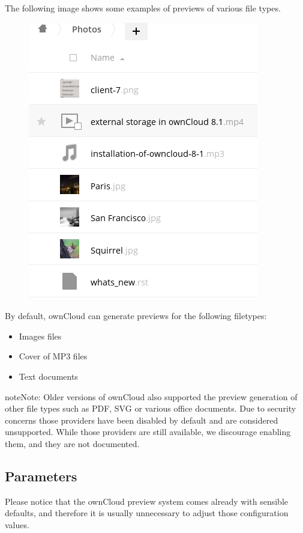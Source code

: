 \documentclass[letterpaper,10pt,english]{sphinxmanual}
\begin{document}
The following image shows some examples of previews of various file types.
\begin{figure}[htbp]
\centering

\includegraphics{preview_images.png}
\end{figure}

By default, ownCloud can generate previews for the following filetypes:
\begin{itemize}
\item {} 
Images files

\item {} 
Cover of MP3 files

\item {} 
Text documents

\end{itemize}

\begin{notice}{note}{Note:}
Older versions of ownCloud also supported the preview generation
of other file types such as PDF, SVG or various office documents.
Due to security concerns those providers have been disabled by
default and are considered unsupported.
While those providers are still available, we discourage enabling
them, and they are not documented.
\end{notice}


\subsection{Parameters}
\label{configuration_files/previews_configuration:parameters}
Please notice that the ownCloud preview system comes already with sensible
defaults, and therefore it is usually unnecessary to adjust those configuration
values.
\end{document}
